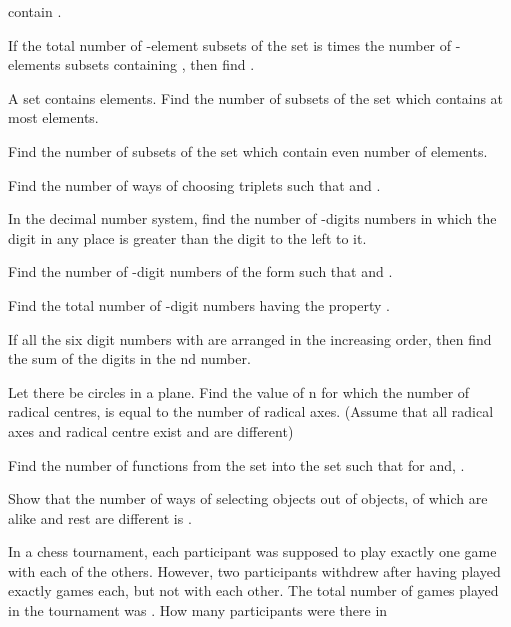   contain .
\item If the total number of -element subsets of the set  is
   times the number of -elements subsets containing , then find .
\item A set contains  elements. Find the number of subsets of the set which contains at most
   elements.
\item Find the number of subsets of the set  which contain even number of
  elements.
\item Find the number of ways of choosing triplets  such that  and
  .
\item In the decimal number system, find the number of -digits numbers in which the digit in any place
  is greater than the digit to the left to it.
\item Find the number of -digit numbers of the form  such that  and .
\item Find the total number of -digit numbers  having the property
  .
\item If all the six digit numbers  with  are arranged in the increasing order, then find the sum of the digits in the nd number.
\item Let there be  circles in a plane. Find the value of n for which the number of
   radical centres, is equal to the number of radical axes. (Assume that all radical axes and radical centre
   exist and are different)
\item Find the number of functions  from the set  into the set  such that  for  and, .
\item Show that the number of ways of selecting  objects out of  objects,  of which are
  alike and rest are different is .
\item In a chess tournament, each participant was supposed to play exactly one game with each of the
  others. However, two participants withdrew after having played exactly  games each, but not with each
  other. The total number of games played in the tournament was . How many participants were there in
